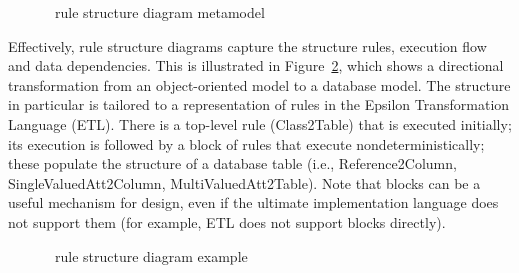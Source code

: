 \begin{figure}[htbp]
\caption{\transml\ rule structure diagram metamodel}
\label{fig:transml-rulestructure}
\end{figure}

Effectively, rule structure diagrams capture the structure rules, execution flow and data dependencies. This is illustrated in Figure~\ref{fig:transml-rulestructure-example}, which shows a directional transformation from an object-oriented model to a database model. The structure in particular is tailored to a representation of rules in the Epsilon Transformation Language (ETL). There is a top-level rule (Class2Table) that is executed initially; its execution is followed by a block of rules that execute nondeterministically; these populate the structure of a database table (i.e., Reference2Column, SingleValuedAtt2Column, MultiValuedAtt2Table). Note that blocks can be a useful mechanism for design, even if the ultimate implementation language does not support them (for example, ETL does not support blocks directly).

\begin{figure}[htbp]
\caption{\transml\ rule structure diagram example}
\label{fig:transml-rulestructure-example}
\end{figure}

